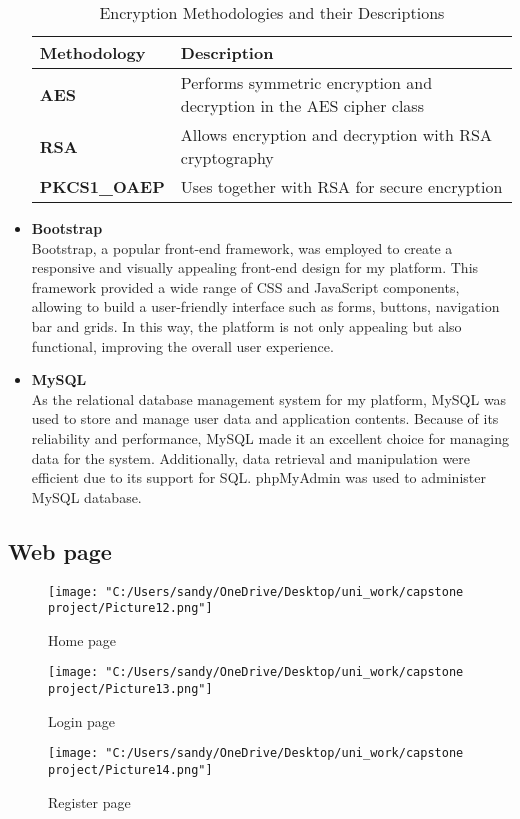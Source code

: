 \documentclass[12pt]{article}
\begin{document}
\begin{itemize}
\begin{table}[htbp]
	\centering
	\begin{tabular}{|>{\bfseries}m{5cm}|m{7cm}|}  %
		\hline
		\textbf{Methodology} & \textbf{Description} \\
		\hline
		AES  & Performs symmetric encryption and decryption in the AES cipher class \\
		\hline
		RSA  & Allows encryption and decryption with RSA cryptography \\
		\hline
		PKCS1\_OAEP  & Uses together with RSA for secure encryption \\
		\hline
	\end{tabular}
	\caption{Encryption Methodologies and their Descriptions}
	\label{tab:encryption_methods}
\end{table}
\pagebreak
\item \textbf{Bootstrap}\\
Bootstrap, a popular front-end framework, was employed to create a responsive and visually appealing front-end design for my platform. This framework provided a wide range of CSS and JavaScript components, allowing to build a user-friendly interface such as forms, buttons, navigation bar and grids. In this way, the platform is not only appealing  but also functional, improving the overall user experience.
\item \textbf{MySQL}\\
As the relational database management system for my platform, MySQL was used to store and manage user data and application contents. Because of its reliability and performance, MySQL made it an excellent choice for managing data for the system. Additionally, data retrieval and manipulation were efficient due to its support for SQL. phpMyAdmin was used to administer MySQL database.
\end{itemize}


\pagebreak
\subsection{Web page}

\begin{figure}[H]  %
	\centering
	\texttt{[image: "C:/Users/sandy/OneDrive/Desktop/uni\_work/capstone project/Picture12.png"]}
	\caption{Home page}
\end{figure}
\begin{figure}[H]
	\centering
	\texttt{[image: "C:/Users/sandy/OneDrive/Desktop/uni\_work/capstone project/Picture13.png"]}
	\caption{Login page}
	
\end{figure}
\begin{figure}[H]
	\centering
	\texttt{[image: "C:/Users/sandy/OneDrive/Desktop/uni\_work/capstone project/Picture14.png"]}
	\caption{Register page}
	
\end{figure}
\end{document}
